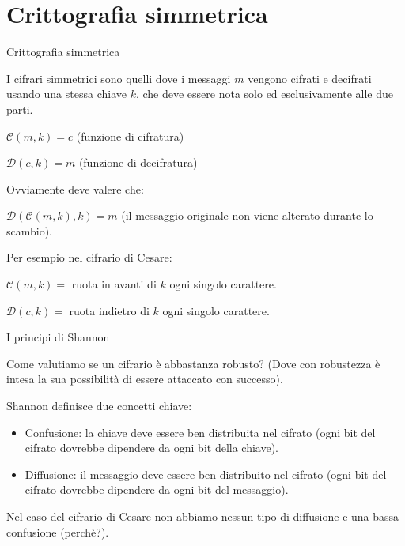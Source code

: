 \documentclass[handout, xcolor=dvipsnames,aspectratio=169]{beamer}
\begin{document}
\part{Crittografia simmetrica}

\begin{frame}
	\partpage
	\centering
\end{frame}

\begin{frame}{Crittografia simmetrica}

  \pause

  I cifrari simmetrici sono quelli dove i messaggi $m$ vengono cifrati e decifrati usando una stessa chiave $k$, che deve essere nota solo ed esclusivamente alle due parti.
  
  \medskip

  \pause
  $\mathcal{C}(m, k) = c$ (funzione di cifratura)
    
  $\mathcal{D}(c, k) = m$ (funzione di decifratura)
  
  \medskip

  Ovviamente deve valere che:
  
  $\mathcal{D}(\mathcal{C}(m, k), k) = m$ (il messaggio originale non viene alterato durante lo scambio).
  
  \medskip
  \pause
  
  Per esempio nel cifrario di Cesare:
  
  $\mathcal{C}(m, k) = $ ruota in avanti di $k$ ogni singolo carattere.
  
  $\mathcal{D}(c, k) = $ ruota indietro di $k$ ogni singolo carattere.
  
\end{frame}

\begin{frame}{I principi di Shannon}

  \pause
  Come valutiamo se un cifrario è abbastanza robusto? (Dove con robustezza è intesa la sua possibilità di essere attaccato con successo). 
  
  \medskip
  \pause
  Shannon definisce due concetti chiave:
  
  \begin{itemize}
    \item Confusione: la chiave deve essere ben distribuita nel cifrato (ogni bit del cifrato dovrebbe dipendere da ogni bit della chiave).
    \item Diffusione: il messaggio deve essere ben distribuito nel cifrato (ogni bit del cifrato dovrebbe dipendere da ogni bit del messaggio).
  \end{itemize}
  
  \medskip
  \pause
  
  Nel caso del cifrario di Cesare non abbiamo nessun tipo di diffusione e una bassa confusione (perchè?).
  
\end{frame}
\end{document}

